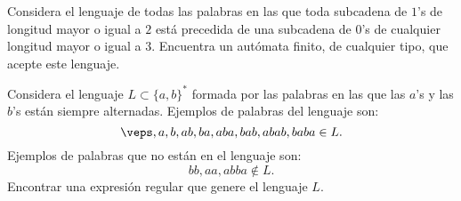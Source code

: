 \documentclass[12pt]{article}
\begin{document}
    \begin{ejercicio}
        Considera el lenguaje de todas las palabras en las que toda subcadena de $1$'s de longitud mayor o igual a $2$ está precedida de una subcadena de $0$'s de cualquier longitud mayor o igual a $3$. Encuentra un autómata finito, de cualquier tipo, que acepte este lenguaje.
    \end{ejercicio}

    \begin{ejercicio}
        Considera el lenguaje $L\subset \{a,b\}^*$ formada por las palabras en las que las $a$'s y las $b$'s están siempre alternadas. Ejemplos de palabras del lenguaje son:
        \begin{equation*}
            \veps,a,b,ab,ba,aba,bab,abab,baba \in L.
        \end{equation*}
        Ejemplos de palabras que no están en el lenguaje son:
        \begin{equation*}
            bb,aa,abba \notin L.
        \end{equation*}
        Encontrar una expresión regular que genere el lenguaje $L$.
    \end{ejercicio}
\end{document}
